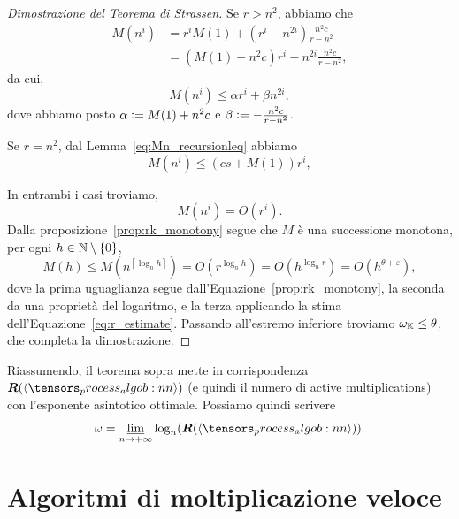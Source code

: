 \begin{proof}[Dimostrazione del Teorema di Strassen]
	Se $ r > n^2 $, abbiamo che
	\begin{equation*}
		\begin{aligned}
			M(n^i) & = r^i M(1) + (r^i - n^{2i})\frac{n^2c}{r-n^2}  \\
			       & = (M(1) + n^2c)r^i - n^{2i}\frac{n^2c}{r-n^2},
		\end{aligned}
	\end{equation*}
	da cui,
	\begin{equation*}
		M(n^i) \le \alpha r^i + \beta n^{2i},
	\end{equation*}
	dove abbiamo posto $ \alpha \vcentcolon= M(1) + n^2c $ e $ \beta \vcentcolon= - \frac{n^2c}{r-n^2}$.

	Se $ r = n^2 $, dal Lemma~\eqref{eq:Mn_recursionleq} abbiamo
	\begin{equation*}
		M(n^i) \le (cs + M(1))r^i,
	\end{equation*}

	In entrambi i casi troviamo,
	\begin{equation}
		\label{eq:Mn_as_O_ri}
		M(n^i) = O(r^i).
	\end{equation}
	Dalla proposizione~\ref{prop:rk_monotony} segue che $M$ è una successione monotona, per
	ogni $ h \in \mathbb{N} \setminus \{0\}  $,
	\begin{equation}
		\label{eq:chain_strassen_theorem}
		M(h) \le M(n^{\left\lceil \log_{n} h \right\rceil }) = O(r^{\log_{n}h}) = O(h^{\log_{n}r}) = O(h^{\theta + \varepsilon}),
	\end{equation}
	dove la prima uguaglianza segue dall'Equazione~\ref{prop:rk_monotony}, la seconda da una proprietà del logaritmo, e la terza
	applicando la stima dell'Equazione~\eqref{eq:r_estimate}.
	Passando all'estremo inferiore troviamo $ \omega_{\mathbb{K}} \le \theta $, che completa la dimostrazione.
\end{proof}

\begin{remark}
	Riassumendo, il teorema sopra mette in corrispondenza $ \rk(\algob{n}) $ (e quindi il numero di active multiplications) con l'esponente
	asintotico ottimale. Possiamo quindi scrivere
	\begin{equation}
		\label{eq:omega_as_rank}
		\omega = \lowlim_{n \to +\infty} \log_n \left( \rk(\algob{n}) \right).
	\end{equation}
\end{remark}


\section{Algoritmi di moltiplicazione veloce}

